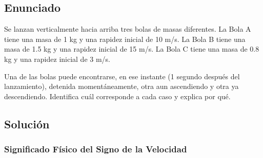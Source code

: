 \documentclass[12pt, a4paper]{article}
\begin{document}
\newpage

\subsection*{Enunciado}

Se lanzan verticalmente hacia arriba tres bolas de masas diferentes. La Bola A tiene una masa de 1 kg y una rapidez inicial de 10 m/s. La Bola B tiene una masa de 1.5 kg y una rapidez inicial de 15 m/s. La Bola C tiene una masa de 0.8 kg y una rapidez inicial de 3 m/s. 

Una de las bolas puede encontrarse, en ese instante (1 segundo después del lanzamiento), detenida momentáneamente, otra aun ascendiendo y otra ya descendiendo. Identifica cuál corresponde a cada caso y explica por qué.

\vspace{0.5cm}

\begin{center}
\end{center}

\subsection*{Solución}

\subsubsection*{Significado Físico del Signo de la Velocidad}
\end{document}
